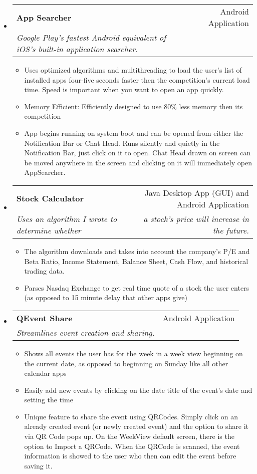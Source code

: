 \documentclass[letterpaper,11pt]{article}
\makeatletter
\newcommand{\resitem}[1]{\item #1 \vspace{-2pt}}
\newcommand{\ressubheading}[4]{
\begin{tabular*}{6.5in}{l@{\extracolsep{\fill}}r}
		\textbf{#1} & #2 \\
		\textit{#3} & \textit{#4} \\
\end{tabular*}\vspace{-6pt}}
\makeatother
\begin{document}
\begin{itemize}

\item 
	\ressubheading{App Searcher}{Android Application}{Google Play's fastest Android equivalent of iOS's built-in application searcher.}{}
	\begin{itemize}
		\resitem{Uses optimized algorithms and multithreading to load the user's list of installed apps four-five seconds faster then the competition's current load time. Speed is important when you want to open an app quickly.}
		\resitem{Memory Efficient: Efficiently designed to use 80\% less memory then its competition}
		\resitem{App begins running on system boot and can be opened from either the Notification Bar or Chat Head. Runs silently and quietly in the Notification Bar, just click on it to open. Chat Head drawn on screen can be moved anywhere in the screen and clicking on it will immediately open AppSearcher.}
	\end{itemize}

\item
	\ressubheading{Stock Calculator}{Java Desktop App (GUI) and Android Application}{Uses an algorithm I wrote to determine whether}{a stock's price will increase in the future.\space\space\space\space\space\space\space\space\space}
	\begin{itemize}
		\resitem{The algorithm downloads and takes into account the company’s P/E and Beta Ratio, Income Statement, Balance Sheet, Cash Flow, and historical trading data.}
		\resitem{Parses Nasdaq Exchange to get real time quote of a stock the user enters (as opposed to 15 minute delay that other apps give)}
	\end{itemize}


\item
	\ressubheading{QEvent Share}{Android Application}{Streamlines event creation and sharing.}{}
	\begin{itemize}
		\resitem{Shows all events the user has for the week in a week view beginning on the current date, as opposed to beginning on Sunday like all other calendar apps}
		\resitem{Easily add new events by clicking on the date title of the event’s date and setting the time}
		\resitem{Unique feature to share the event using QRCodes. Simply click on an already created event (or newly created event) and the option to share it via QR Code pops up. On the WeekView default screen, there is the option to Import a QRCode. When the QRCode is scanned, the event information is showed to the user who then can edit the event before saving it.}
	\end{itemize}


\end{itemize}
\end{document}
